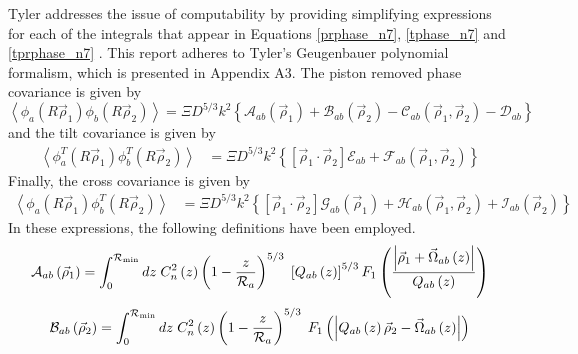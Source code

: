 Tyler addresses the issue of computability by providing simplifying
expressions for each of the integrals that appear in Equations
\ref{prphase_n7}, \ref{tphase_n7} and \ref{tprphase_n7} .  This report
adheres to Tyler's Geugenbauer polynomial formalism, which is
presented in Appendix A3\cite{1994JOSAA..11..409T}.  The piston
removed phase covariance is given by
\begin{equation}\label{phasecovariance}
\left\langle \phi_{a}\left(R\vec{\rho}_{1}\right)  \phi_{b}\left(R\vec{\rho}_{2}\right)\right\rangle = 
\Xi D^{5/3} k^{2} \left\{
\mathcal{A}_{ab}\left(\vec{\rho}_{1}\right) + 
\mathcal{B}_{ab}\left(\vec{\rho}_{2}\right) - 
\mathcal{C}_{ab}\left(\vec{\rho}_{1},\vec{\rho}_{2}\right) - 
\mathcal{D}_{ab}\right\}
\end{equation}
and the tilt covariance is given by
\begin{equation}\label{tiltcovariance}
\begin{split}
\left\langle \phi^{T}_{a}\left(R\vec{\rho}_{1}\right)  \phi^{T}_{b}\left(R\vec{\rho}_{2}\right)\right\rangle & = 
\Xi D^{5/3} k^{2} \left\{
\left[\vec{\rho}_{1} \cdot \vec{\rho}_{2} \right] \mathcal{E}_{ab} + 
\mathcal{F}_{ab}\left(\vec{\rho}_{1}, \vec{\rho}_{2}\right)
\right\} 
\end{split}
\end{equation}
Finally, the cross covariance is given by
\begin{equation}\label{crosscovariance}
\begin{split}
\left\langle \phi_{a}\left(R\vec{\rho}_{1}\right)  \phi^{T}_{b}\left(R\vec{\rho}_{2}\right)\right\rangle & = 
\Xi D^{5/3} k^{2} \left\{
\left[\vec{\rho}_{1} \cdot \vec{\rho}_{2} \right] \mathcal{G}_{ab}\left(\vec{\rho}_{1}\right) + 
\mathcal{H}_{ab}\left(\vec{\rho}_{1}, \vec{\rho}_{2}\right) + 
\mathcal{I}_{ab}\left(\vec{\rho}_{2}\right)
\right\} 
\end{split}
\end{equation}
In these expressions, the following definitions have been employed.
\begin{equation}\label{caliph_A}
\mathcal{A}_{ab}\left(\vec{\rho}_{1}\right) = 
\int_{0}^{\mathcal{R}_{\rm min}} dz \; C_{n}^{2}\left(z\right) \left( 1 - \frac{z}{\mathcal{R}_{a}}\right)^{5/3}\; 
\left[Q_{ab}\left(z\right)\right]^{5/3} 
F_{1}\left(\frac{\left\vert\vec{\rho}_{1} + \vec{\Omega}_{ab}\left(z\right)\right\vert}{Q_{ab}\left(z\right)}\right)
\end{equation}
\begin{equation}\label{caliph_B}
\mathcal{B}_{ab}\left(\vec{\rho}_{2}\right) = 
\int_{0}^{\mathcal{R}_{\rm min}} dz \; C_{n}^{2}\left(z\right) \left( 1 - \frac{z}{\mathcal{R}_{a}}\right)^{5/3}\; 
F_{1}\left(\left\vert Q_{ab}\left(z\right)\vec{\rho}_{2} - \vec{\Omega}_{ab}\left(z\right)\right\vert\right)
\end{equation}
